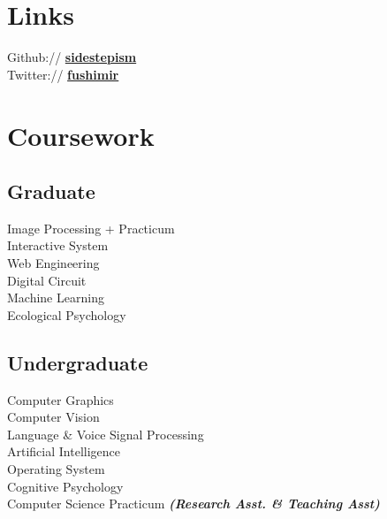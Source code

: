 \documentclass[letterpaper]{deedy-resume} %
\begin{document}
\begin{minipage}[t]{0.33\textwidth}

\section{Links} 

Github:// \href{https://github.com/sidestepism}{\bf sidestepism} \\
Twitter:// \href{https://twitter.com/fushimir}{\bf fushimir} \\

\sectionspace %


\section{Coursework}

\subsection{Graduate}

Image Processing + Practicum \\ 
Interactive System \\ 
Web Engineering \\ 
Digital Circuit \\
Machine Learning \\ 
Ecological Psychology

\sectionspace %


\subsection{Undergraduate}

Computer Graphics \\
Computer Vision \\
Language \& Voice Signal Processing \\
Artificial Intelligence \\
Operating System \\
Cognitive Psychology \\
Computer Science Practicum 
{\footnotesize \textit{\textbf{(Research Asst. \& Teaching Asst) }}} \\


\end{minipage}
\end{document}
